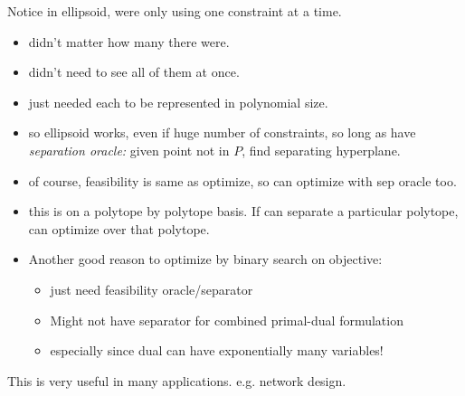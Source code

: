 \documentclass{article}
\begin{document}
Notice in ellipsoid, were only using one constraint at a time.
\begin{itemize}
\item didn't matter how many there were.
\item didn't need to see all of them at once.
\item just needed each to be represented in polynomial size.
\item so ellipsoid works, even if huge number of constraints, so long
  as have {\em separation oracle:} given point not in $P$, find
  separating hyperplane.
\item of course, feasibility is same as optimize, so can optimize with
  sep oracle too.
\item this is on a polytope by polytope basis.  If can separate a
  particular polytope, can optimize over that polytope.
\item Another good reason to optimize by binary search on objective:
\begin{itemize}
\item just need feasibility oracle/separator
\item Might not have separator for combined primal-dual formulation
\item especially since dual can have exponentially many variables!
\end{itemize}
\end{itemize}

This is very useful in many applications.  e.g. network design.
\end{document}
